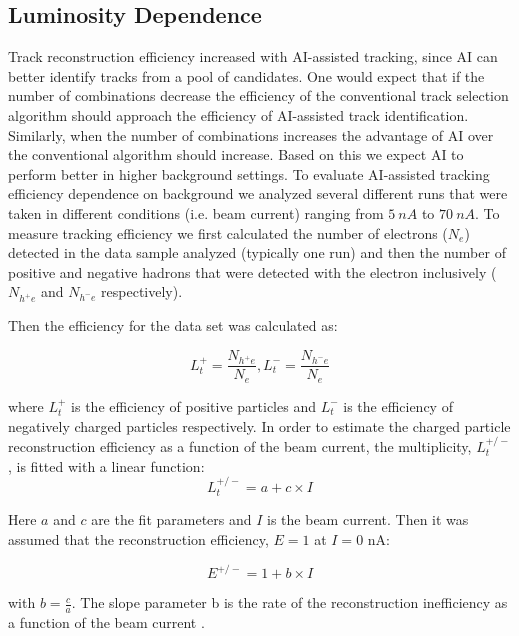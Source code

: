 \subsection{Luminosity Dependence}

Track reconstruction efficiency increased with AI-assisted tracking, since AI can better identify tracks
from a pool of candidates. One would expect that if the number of combinations decrease the efficiency 
of the conventional track selection algorithm should approach the efficiency of AI-assisted track identification.
Similarly, when the number of combinations increases the advantage of AI over the conventional algorithm should
increase. Based on this we expect AI to perform better in higher background settings. To evaluate AI-assisted
tracking efficiency dependence on background we analyzed several different runs that were taken in different 
conditions (i.e. beam current) ranging from $5~nA$ to $70~nA$. To measure tracking efficiency we first calculated
the number of electrons ($N_e$) detected in the data sample analyzed (typically one run) and then the number of positive and negative
 hadrons that were detected with the electron inclusively ($N_{h^+e}$ and $N_{h^-e}$ respectively).

Then the efficiency for the data set was calculated as:

\begin{equation}
L_t^+ = \frac{N_{h^+e}}{N_e} , L_t^- = \frac{N_{h^-e}}{N_e} 
\end{equation}

where $L_t^+$ is the efficiency of positive particles and $L_t^-$ is the efficiency of negatively charged particles respectively. 
In order to estimate the charged particle reconstruction efficiency as a function of the beam current, the multiplicity, $L_t^{+/-}$, is fitted with a linear function:
\begin{equation}
L_t^{+/-} = a + c\times I 
\end{equation}

Here $a$ and $c$ are the fit parameters and $I$ is the beam current. Then it was assumed that the reconstruction efficiency, $E=1$ at $I=0$ nA:

\begin{equation}
E^{+/-} = 1 + b \times I 
\end{equation}

with $b=\frac{c}{a}$. The slope parameter b is the rate of the reconstruction inefficiency as a function of the beam current \cite{Stepanyan:2020bg}.
 
